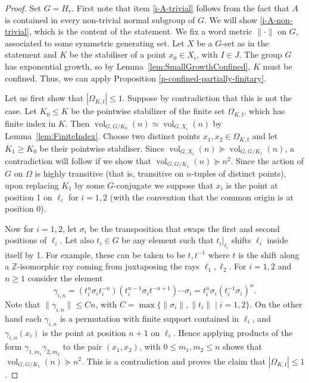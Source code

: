 \documentclass[11pt]{amsart}
\newcommand{\Z}{\ensuremath{\mathbb{Z}}}%
\newcommand{\vol}{\ensuremath{\operatorname{vol}}}%
\theoremstyle{definition}
\theoremstyle{plain}
\theoremstyle{remark}
\begin{document}
\begin{proof}

Set $G=H_r$. First note that item \eqref{i-A-trivial} follows from the fact that $A$ is contained in every non-trivial normal subgroup of $G$. We will show \eqref{i-A-non-trivial}, which is the content of the statement.
We fix a word metric $\lVert \cdot \rVert$ on $G$, associated to some symmetric generating set. Let $X$ be  a $G$-set as in the statement and $K$ be the stabiliser of a point $x_0\in X_i$, with $I\in J$. The group $G$ has exponential growth, so by Lemma~\ref{lem:SmallGrowthConfined}, $K$ must be confined. Thus, we can apply Proposition \ref{p-confined-partially-finitary}.

Let us first show that $|\Omega_{K, \mathrm{f}}|\le 1$. Suppose by contradiction that this is not the case. Let $K_0\le K$ be the pointwise stabilizer of the finite set $\Omega_{K, \mathrm{f}}$, which has finite index in $K$. Then $\vol_{G, G/K_0}(n)\simeq \vol_{G, X_i}(n)$ by Lemma~\ref{lem:FiniteIndex}.  Choose two distinct points $x_1, x_2\in \Omega_{K, \mathrm{f}}$ and let $K_1 \ge K_0$ be their pointwise stabiliser. Since $\vol_{G, X_i}(n) \succcurlyeq \vol_{G, G/K_1}(n)$, a contradiction will follow if we show that $\vol_{G, G/K_1}(n)\succcurlyeq n^2$. Since the action of $G$ on $\Omega$ is highly transitive (that is, transitive on $n$-tuples of distinct points), upon replacing $K_1$ by some $G$-conjugate we suppose that $x_i$ is the point at position 1 on $\ell_i$ for $i=1, 2$ (with the convention that the common origin is at position 0).

Now for $i=1, 2$, let  $\sigma_i$ be the transposition that swaps the first and second positions of $\ell_i$. Let also $t_i\in G$ be any element such that $t_i|_{\ell_i}$ shifts $\ell_i$ inside itself by 1. For example, these can be taken to be $t, t^{-1}$ where $t$ is the shift along a $\Z$-isomorphic ray coming from juxtaposing the rays $\ell_1, \ell_2$. For $i=1, 2$ and $n\ge 1$ consider the element
 \[\gamma_{i, n}=(t_i^n\sigma_i t_i^{-n})(t_i^{n-1} \sigma_i t^{-n+1}) \cdots \sigma_i=t_i^n\sigma_i (t_i^{-1}\sigma_i)^n.\]
Note that $\lVert\gamma_{i, n}\rVert \le Cn$, with $C=\max\{\lVert \sigma_i \rVert, \lVert t_i\rVert \;|\; i=1,2\}$.  On the other hand each $\gamma_{i, n}$ is a permutation with finite support contained in $\ell_i$, and $\gamma_{i, n}(x_i)$ is the point at position $n+1$ on $\ell_i$. Hence applying products of the form $\gamma_{1, m_1} \gamma_{2, m_2}$ to the pair $(x_1, x_2)$, with $0\le m_1, m_2\le n$ shows that $\vol_{G, G/K_1}(n)\succcurlyeq n^2$. This is a contradiction and proves the claim that $|\Omega_{K, \mathrm{f}}|\le 1$.


\end{proof}
\end{document}
